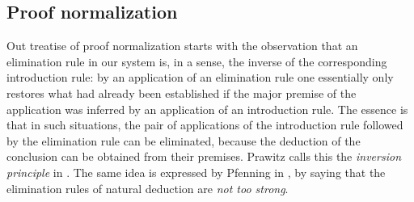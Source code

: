 
\subsection{Proof normalization}


Out treatise of proof normalization starts with the observation that an
elimination rule in our system is, in a sense, the inverse of the corresponding
introduction rule: by an application of an elimination rule one essentially only
restores what had already been established if the major premise of the
application was inferred by an application of an introduction rule. The essence
is that in such situations, the pair of applications of the introduction rule
followed by the elimination rule can be eliminated, because the deduction of the
conclusion can be obtained from their premises. Prawitz calls this the
\emph{inversion principle} in \cite{prawitz1965}. The same idea is expressed by
Pfenning in \cite{pfenninglecturescl}, by saying that the elimination rules of
natural deduction are \emph{not too strong}.

